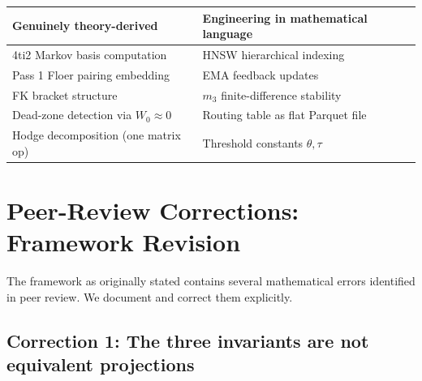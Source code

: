 \documentclass[11pt,a4paper]{article}
\begin{document}
\begin{center}
\renewcommand{\arraystretch}{1.3}
\begin{tabular}{ll}
\toprule
\textbf{Genuinely theory-derived} & \textbf{Engineering in mathematical language} \\
\midrule
4ti2 Markov basis computation & HNSW hierarchical indexing \\
Pass 1 Floer pairing embedding & EMA feedback updates \\
FK bracket structure & $m_3$ finite-difference stability \\
Dead-zone detection via $W_0 \approx 0$ & Routing table as flat Parquet file \\
Hodge decomposition (one matrix op) & Threshold constants $\theta, \tau$ \\
\bottomrule
\end{tabular}
\end{center}


\section{Peer-Review Corrections: Framework Revision}
\label{sec:peer-review-corrections}

The framework as originally stated contains several mathematical errors
identified in peer review. We document and correct them explicitly.

\subsection*{Correction 1: The three invariants are not equivalent projections}
\end{document}
